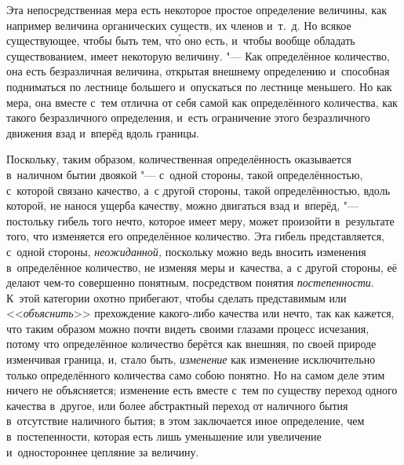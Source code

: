 Эта непосредственная мера есть некоторое простое определение величины, как
например величина органических существ, их членов и~т.~д. Но всякое
существующее, чтобы быть тем, чт\'{о} оно есть, и~чтобы вообще обладать
существованием, имеет некоторую величину. "--- Как определённое количество, она
есть безразличная величина, открытая внешнему определению и~способная
подниматься по лестнице большего и~опускаться по лестнице меньшего. Но как
мера, она вместе с~тем отлична от себя самой как определённого количества, как
такого безразличного определения, и~есть ограничение этого безразличного
движения взад и~вперёд вдоль границы.

Поскольку, таким образом, количественная определённость оказывается в~наличном
бытии двоякой "--- с~одной стороны, такой определённостью, с~которой связано
качество, а~с другой стороны, такой определённостью, вдоль которой, не нанося
ущерба качеству, можно двигаться взад и~вперёд, "--- постольку гибель того
нечто, которое имеет меру, может произойти в~результате того, что изменяется
его определённое количество. Эта гибель представляется, с~одной стороны,
{\em неожиданной,} поскольку можно ведь вносить изменения в~определённое
количество, не изменяя меры и~качества, а~с другой стороны, её делают чем-то
совершенно понятным, посредством понятия {\em постепенности}. К~этой категории
охотно прибегают, чтобы сделать представимым или <<{\em объяснить}>>
прехождение какого-либо качества или нечто, так как кажется, что таким образом
можно почти видеть своими глазами процесс исчезания, потому что определённое
количество берётся как внешняя, по своей природе изменчивая граница, и, стало
быть, {\em изменение} как изменение исключительно только определённого
количества само собою понятно. Но на самом деле этим ничего не объясняется;
изменение есть вместе с~тем по существу переход одного качества в~другое, или
более абстрактный переход от наличного бытия в~отсутствие наличного бытия; в
этом заключается иное определение, чем в~постепенности, которая есть лишь
уменьшение или увеличение и~одностороннее цепляние за величину.

